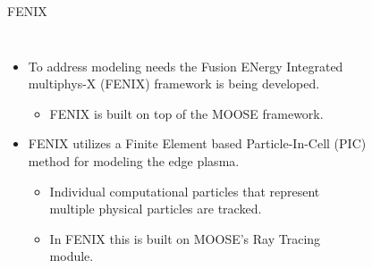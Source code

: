 \documentclass[aspectratio=169, 16pt]{beamer}
\begin{document}
\begin{frame}{FENIX}
  \vspace{0.5cm}
  \begin{columns}
    \begin{itemize}
      \item To address modeling needs the Fusion ENergy Integrated multiphys-X (FENIX) framework is being developed.
      \begin{itemize}
        \item FENIX is built on top of the MOOSE framework.
      \end{itemize}
       \item FENIX utilizes a Finite Element based Particle-In-Cell (PIC) method for modeling the edge plasma.
      \begin{itemize}
        \item Individual computational particles that represent multiple physical particles are tracked.
        \item In FENIX this is built on MOOSE's Ray Tracing module.
      \end{itemize}
    \end{itemize}
    \vspace{0.5cm}
    \begin{figure}[H]
      \centering

\end{figure}
\end{columns}
\end{frame}
\end{document}
